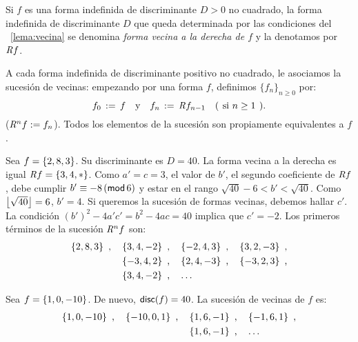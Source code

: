 \begin{defIndefinidas}\label{def:vecina}
	Si $f$ es una forma indefinida de discriminante $D>0$ no cuadrado, la
	forma indefinida de discriminante $D$ que queda determinada por las
	condiciones del \lemaname~\ref{lema:vecina} se denomina \emph{forma %
	vecina a la derecha de $f$} y la denotamos por $\rneigh f$.
\end{defIndefinidas}

A cada forma indefinida de discriminante positivo no cuadrado,
le asociamos la sucesi\'on de vecinas: empezando por una forma $f$,
definimos $\{f_n\}_{n\geq 0}$ por:
\begin{displaymath}
	f_0\,:=\,f\dispand f_n\,:=\,\rneigh f_{n-1}
		\quad\text{(\phantom)si } n\geq 1\text{\phantom().}
\end{displaymath}
%
($\rneigh^n f:=f_n$).
Todos los elementos de la sucesi\'on son propiamente equivalentes a $f$.

\begin{ejemIndefinidas}\label{ejem:vecina:cuarenta}
	Sea $f=\binaria{2,8,3}$. Su discriminante es $D=40$. La forma
	vecina a la derecha es igual $\rneigh f=\binaria{3,4,*}$.
	Como $a'=c=3$, el valor de $b'$, el segundo coeficiente de 
	$\rneigh f$, debe cumplir $b'\equiv -8\tmodulo[6]$ y estar en el
	rango $\sqrt{40}-6<b'<\sqrt{40}$. Como $\piso{\sqrt{40}}=6$,
	$b'=4$. Si queremos la sucesi\'on de formas vecinas, debemos
	hallar $c'$. La condici\'on $(b')^2-4a'c'=b^2-4ac=40$ implica que
	$c'=-2$. Los primeros t\'erminos de la sucesi\'on $\rneigh^n f$ son:
	\begin{displaymath}
		\begin{aligned}
			\binaria{2,8,3}\dispcomma\quad &
				\binaria{3,4,-2}\dispcomma\quad
				\binaria{-2,4,3}\dispcomma\quad
				\binaria{3,2,-3}\dispcomma \\
			& \binaria{-3,4,2}\dispcomma\quad
				\binaria{2,4,-3}\dispcomma\quad
				\binaria{-3,2,3}\dispcomma \\
			& \binaria{3,4,-2}\dispcomma\quad\dots
		\end{aligned}
	\end{displaymath}
\end{ejemIndefinidas}

\begin{ejemIndefinidas}\label{ejem:vecina:cuarenta:principal}
	Sea $f=\binaria{1,0,-10}$. De nuevo, $\discriminante(f)=40$.
	La sucesi\'on de vecinas de $f$ es:
	\begin{displaymath}
		\begin{aligned}
			\binaria{1,0,-10}\dispcomma\quad
				\binaria{-10,0,1}\dispcomma\quad &
				\binaria{1,6,-1}\dispcomma\quad
				\binaria{-1,6,1}\dispcomma \\
			& \binaria{1,6,-1}\dispcomma\quad\dots
		\end{aligned}
	\end{displaymath}
\end{ejemIndefinidas}

